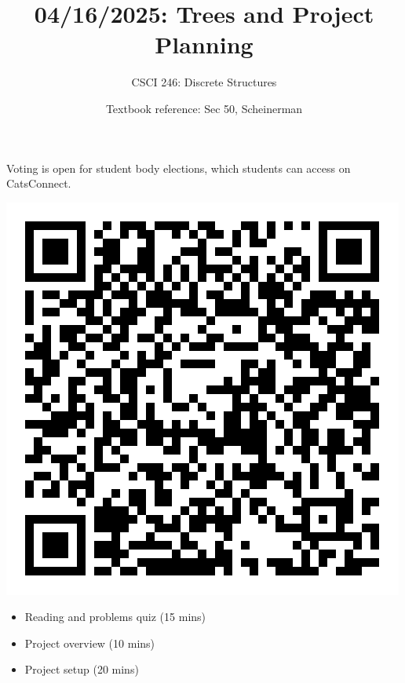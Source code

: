 \documentclass[10pt]{beamer}
\begin{document}




\title{04/16/2025: Trees and Project Planning}
\author{CSCI 246: Discrete Structures}
\date{Textbook reference: Sec 50, Scheinerman}

\begin{frame}
    \titlepage 
\end{frame}


\begin{frame}
\small
\begin{myredbox}[title=Announcement: Student Body Elections]
Voting is open for student body elections, which students can access on CatsConnect.
\begin{center}
\includegraphics[width=.3\textwidth]{images/voting_qr_code.png}
\end{center}
\end{myredbox}
\vfill 
\begin{myyellowbox}[title=Today's Agenda]
\begin{itemize}
	\item Reading and problems quiz (15 mins)
	\item Project overview (10 mins) 
	\item Project setup (20  mins)
\end{itemize}


\end{myyellowbox}
\vfill 

\end{frame}
\end{document}
